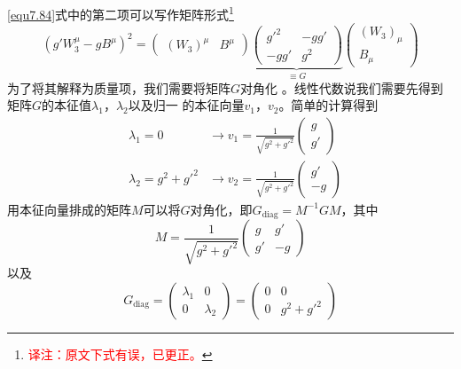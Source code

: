 \ref{equ7.84}式中的第二项可以写作矩阵形式\footnote{\textcolor{red}{译注：原文下式有误，已更正。}}
\begin{equation}
(g'W_3^\mu-gB^\mu)^2 = \begin{pmatrix}
(W_3)^\mu & B^\mu
\end{pmatrix} \underbrace{\begin{pmatrix}
g'^2 & -gg' \\ -gg' & g^2
\end{pmatrix}}_{\equiv G} \begin{pmatrix}
(W_3)_\mu \\ B_\mu
\end{pmatrix}
\label{equ7.89}
\end{equation}
为了将其解释为质量项，我们需要将矩阵$G$对角化%
%
。线性代数说我们需要先得到矩阵$G$的本征值$\lambda_1$，$\lambda_2$以及归一%
%
的本征向量$v_1$，$v_2$。简单的计算得到
\[
\begin{aligned}
&\lambda_1 = 0 &\rightarrow v_1 = \frac{1}{\sqrt{g^2+g'^2}} \begin{pmatrix}
g\\ g'
\end{pmatrix} \\
&\lambda_2 = g^2+g'^2 &\rightarrow v_2 = \frac{1}{\sqrt{g^2+g'^2}} \begin{pmatrix}
g'\\ -g
\end{pmatrix}
\end{aligned}
\]
用本征向量排成的矩阵$M$可以将$G$对角化，即$G_\text{diag}=M^{-1}GM$，其中
\begin{equation}
\label{equ7.90}
M = \frac{1}{\sqrt{g^2+g'^2}} \begin{pmatrix}
g & g'\\ g'&-g
\end{pmatrix}
\end{equation}
以及
\begin{equation}
\label{equ7.91}
G_\text{diag} = \begin{pmatrix}
\lambda_1 & 0 \\ 0 & \lambda_2
\end{pmatrix} = \begin{pmatrix}
0 & 0 \\ 0 & g^2+g'^2
\end{pmatrix}
\end{equation}
